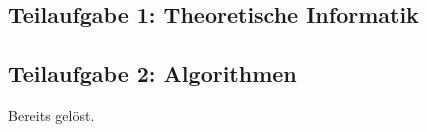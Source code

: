 \subsection*{Teilaufgabe 1: Theoretische Informatik} %
\begin{aufgabe}%
\begin{teile}
	\item
\end{teile}	
\end{aufgabe}

\begin{aufgabe}%
\begin{teile}
	\item
\end{teile}	
\end{aufgabe}


\begin{aufgabe}%
\begin{teile}
	\item
\end{teile}	
\end{aufgabe}


\begin{aufgabe}%
\begin{teile}
	\item
\end{teile}
\end{aufgabe}	

\begin{aufgabe}%
\end{aufgabe}

\newpage
\subsection*{Teilaufgabe 2: Algorithmen} %

\newcommand{\code}[1]{{\larger\texttt{#1}}}

\setcounter{aufgcount}{0}

\begin{aufgabe}%
Bereits gelöst.
\end{aufgabe}


